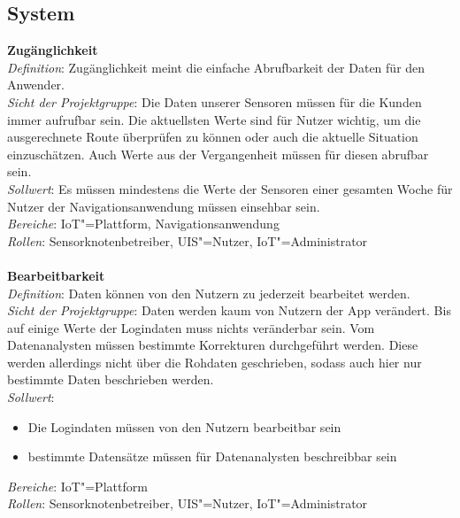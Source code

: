 \subsection{System}
\textbf{Zugänglichkeit}\\
\textit{Definition}: Zugänglichkeit meint die einfache Abrufbarkeit der Daten für den Anwender.  \\
\textit{Sicht der Projektgruppe}: Die Daten unserer Sensoren müssen für die Kunden immer aufrufbar sein. Die aktuellsten Werte sind für Nutzer wichtig, um die ausgerechnete Route überprüfen zu können oder auch die aktuelle Situation einzuschätzen. Auch Werte aus der Vergangenheit müssen für diesen abrufbar sein.  \\
\textit{Sollwert}: Es müssen mindestens die Werte der Sensoren einer gesamten Woche für Nutzer der Navigationsanwendung müssen einsehbar sein.\\
\textit{Bereiche}: IoT"=Plattform, Navigationsanwendung \\
\textit{Rollen}: Sensorknotenbetreiber, UIS"=Nutzer, IoT"=Administrator \\
\\
\textbf{Bearbeitbarkeit}\\
\textit{Definition}: Daten können von den Nutzern zu jederzeit bearbeitet werden.  \\
\textit{Sicht der Projektgruppe}: Daten werden kaum von Nutzern der App verändert. Bis auf einige Werte der Logindaten muss nichts veränderbar sein. Vom Datenanalysten müssen bestimmte Korrekturen durchgeführt werden. Diese werden allerdings nicht über die Rohdaten geschrieben, sodass auch hier nur bestimmte Daten beschrieben werden.\\
\textit{Sollwert}:
\begin{itemize}
\item	Die Logindaten müssen von den Nutzern bearbeitbar sein
\item	bestimmte Datensätze müssen für Datenanalysten beschreibbar sein 
\end{itemize}
\textit{Bereiche}: IoT"=Plattform \\
\textit{Rollen}: Sensorknotenbetreiber, UIS"=Nutzer, IoT"=Administrator \\


